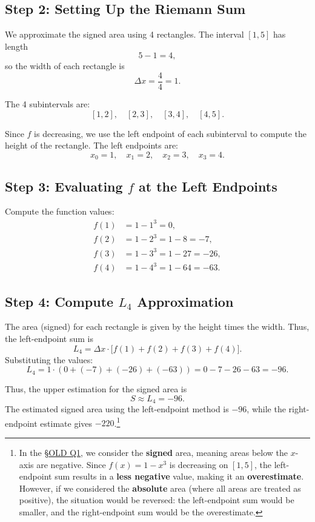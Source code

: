 \documentclass{article}
\begin{document}
\subsection*{Step 2: Setting Up the Riemann Sum}  

We approximate the signed area using 4 rectangles. The interval \([1,5]\) has length  
\[
5 - 1 = 4,
\]
so the width of each rectangle is  
\[
\Delta x = \frac{4}{4} = 1.
\]

The 4 subintervals are:  
\[
[1,2],\quad [2,3],\quad [3,4],\quad [4,5].
\]

Since \( f \) is decreasing, we use the left endpoint of each subinterval to compute the height of the rectangle. The left endpoints are:  
\[
x_0 = 1,\quad x_1 = 2,\quad x_2 = 3,\quad x_3 = 4.
\]

\subsection*{Step 3: Evaluating \( f \) at the Left Endpoints}  

Compute the function values:
\begin{align*}
f(1) &= 1 - 1^3 = 0, \\
f(2) &= 1 - 2^3 = 1 - 8 = -7, \\
f(3) &= 1 - 3^3 = 1 - 27 = -26, \\
f(4) &= 1 - 4^3 = 1 - 64 = -63.
\end{align*}

\subsection*{Step 4: Compute $ L_4 $ Approximation}  

The area (signed) for each rectangle is given by the height times the width. Thus, the left-endpoint sum is  
\[
L_4 = \Delta x \cdot \big[f(1) + f(2) + f(3) + f(4)\big].
\]
Substituting the values:  
\[
L_4 = 1 \cdot (0 + (-7) + (-26) + (-63)) = 0 - 7 - 26 - 63=-96.
\]


Thus, the upper estimation for the signed area is  
\[
\boxed{S \approx L_4 =-96}.
\] 
\newpage
The estimated signed area using the left-endpoint method is \(-96\), while the right-endpoint estimate gives \(-220\).\footnote{In the \S \hyperref[sec:Q1]{OLD Q1}, we consider the \textbf{signed} area, meaning areas below the \( x \)-axis are negative. Since \( f(x) = 1 - x^3 \) is decreasing on \([1,5]\), the left-endpoint sum results in a \textbf{less negative} value, making it an \textbf{overestimate}. However, if we considered the \textbf{absolute} area (where all areas are treated as positive), the situation would be reversed: the left-endpoint sum would be smaller, and the right-endpoint sum would be the overestimate.}
\end{document}
